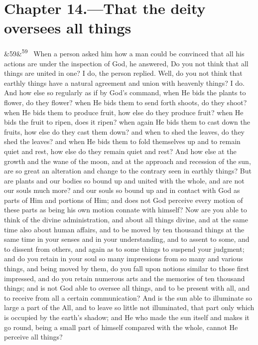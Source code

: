 \documentclass[12pt]{article}
\newcommand{\para}[1][]{\par\noindent\ifx&#1&\else\textsuperscript{\footnotesize #1}~\fi}
\begin{document}
\section*{Chapter 14.---That the deity oversees all things}

\para[59] When a person asked him how a man could be convinced that all his actions are under the inspection of God, he answered, Do you not think that all things are united in one? I do, the person replied. Well, do you not think that earthly things have a natural agreement and union with heavenly things? I do. And how else so regularly as if by God's command, when He bids the plants to flower, do they flower? when He bids them to send forth shoots, do they shoot? when He bids them to produce fruit, how else do they produce fruit? when He bids the fruit to ripen, does it ripen? when again He bids them to cast down the fruits, how else do they cast them down? and when to shed the leaves, do they shed the leaves? and when He bids them to fold themselves up and to remain quiet and rest, how else do they remain quiet and rest? And how else at the growth and the wane of the moon, and at the approach and recession of the sun, are so great an alteration and change to the contrary seen in earthly things? But are plants and our bodies so bound up and united with the whole, and are not our souls much more? and our souls so bound up and in contact with God as parts of Him and portions of Him; and does not God perceive every motion of these parts as being his own motion connate with himself? Now are you able to think of the divine administration, and about all things divine, and at the same time also about human affairs, and to be moved by ten thousand things at the same time in your senses and in your understanding, and to assent to some, and to dissent from others, and again as to some things to suspend your judgment; and do you retain in your soul so many impressions from so many and various things, and being moved by them, do you fall upon notions similar to those first impressed, and do you retain numerous arts and the memories of ten thousand things; and is not God able to oversee all things, and to be present with all, and to receive from all a certain communication? And is the sun able to illuminate so large a part of the All, and to leave so little not illuminated, that part only which is occupied by the earth's shadow; and He who made the sun itself and makes it go round, being a small part of himself compared with the whole, cannot He perceive all things?
\end{document}
